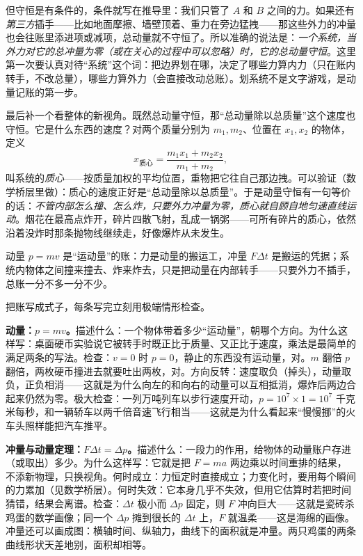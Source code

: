 但守恒是有条件的，条件就写在推导里：我们只管了 \(A\) 和 \(B\) 之间的力。如果还有\emph{第三方}插手——比如地面摩擦、墙壁顶着、重力在旁边猛拽——那这些外力的冲量也会往账里添进项或减项，总动量就不守恒了。所以准确的说法是：\emph{一个系统，当外力对它的总冲量为零（或在关心的过程中可以忽略）时，它的总动量守恒}。这里第一次要认真对待“系统”这个词：把边界划在哪，决定了哪些力算内力（只在账内转手，不改总量），哪些力算外力（会直接改动总账）。划系统不是文字游戏，是动量记账的第一步。

最后补一个看整体的新视角。既然总动量守恒，那“总动量除以总质量”这个速度也守恒。它是什么东西的速度？对两个质量分别为 \(m_1,m_2\)、位置在 \(x_1,x_2\) 的物体，定义
\[
x_{\text{质心}}=\frac{m_1x_1+m_2x_2}{m_1+m_2},
\]
叫系统的\emph{质心}——按质量加权的平均位置，重物把它往自己那边拽。可以验证（数学桥层里做）：质心的速度正好是“总动量除以总质量”。于是动量守恒有一句等价的话：\emph{不管内部怎么撞、怎么炸，只要外力冲量为零，质心就自顾自地匀速直线运动}。烟花在最高点炸开，碎片四散飞射，乱成一锅粥——可所有碎片的质心，依然沿着没炸时那条抛物线继续走，好像爆炸从未发生。


\begin{oneline}
动量 \(p=mv\) 是“运动量”的账：力是动量的搬运工，冲量 \(F\Delta t\) 是搬运的凭据；系统内物体之间撞来撞去、炸来炸去，只是把动量在内部转手——只要外力不插手，总账一分不多一分不少。
\end{oneline}


把账写成式子，每条写完立刻用极端情形检查。

\textbf{动量：\(p=mv\)。}描述什么：一个物体带着多少“运动量”，朝哪个方向。为什么这样写：桌面硬币实验说它被转手时既正比于质量、又正比于速度，乘法是最简单的满足两条的写法。检查：\(v=0\) 时 \(p=0\)，静止的东西没有运动量，对。\(m\) 翻倍 \(p\) 翻倍，两枚硬币撞进去就要吐出两枚，对。方向反转：速度取负（掉头），动量取负，正负相消——这就是为什么向左的和向右的动量可以互相抵消，爆炸后两边合起来仍然为零。极大检查：一列万吨列车以步行速度开动，\(p=10^{7}\times1=10^{7}\) 千克米每秒，和一辆轿车以两千倍音速飞行相当——这就是为什么看起来“慢慢挪”的火车头照样能把汽车推平。

\textbf{冲量与动量定理：\(F\Delta t=\Delta p\)。}描述什么：一段力的作用，给物体的动量账户存进（或取出）多少。为什么这样写：它就是把 \(F=ma\) 两边乘以时间重排的结果，不添新物理，只换视角。何时成立：力恒定时直接成立；力变化时，要用每个瞬间的力累加（见数学桥层）。何时失效：它本身几乎不失效，但用它估算时若把时间猜错，结果会离谱。检查：\(\Delta t\) 极小而 \(\Delta p\) 固定，则 \(F\) 冲向巨大——这就是瓷砖杀鸡蛋的数学画像；同一个 \(\Delta p\) 摊到很长的 \(\Delta t\) 上，\(F\) 就温柔——这是海绵的画像。冲量还可以画成图：横轴时间、纵轴力，曲线下的面积就是冲量。两只鸡蛋的两条曲线形状天差地别，面积却相等。

